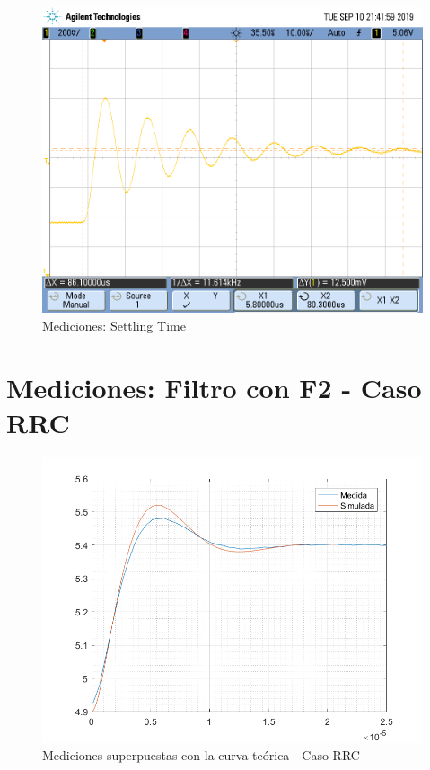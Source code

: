 \documentclass{article}
\begin{document}
\begin{figure}[H]
\centering
\includegraphics[width=0.8\linewidth]{images/settling_time.PNG}
\caption{Mediciones: Settling Time}
\label{fig:ts}
\end{figure}

\newpage

\section*{Mediciones: Filtro con F2 - Caso RRC}

\begin{figure}[H]
\centering
\includegraphics[width=0.8\linewidth]{images/conF2_superpuestas05.PNG}
\caption{Mediciones superpuestas con la curva teórica - Caso RRC}
\label{fig:superpF2}
\end{figure}
\end{document}
